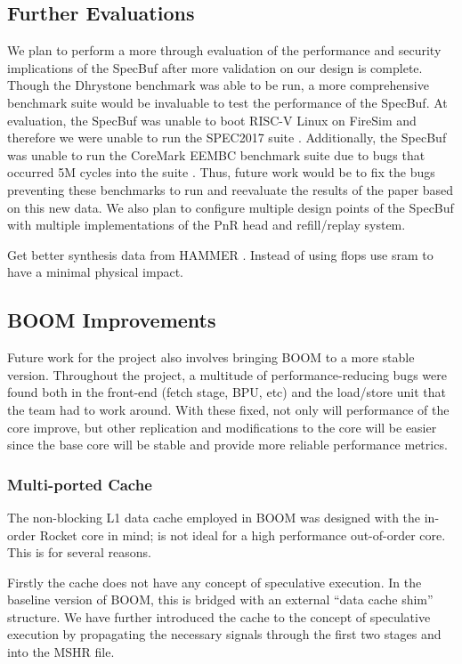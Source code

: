 \subsection{Further Evaluations}

We plan to perform a more through evaluation of the performance and security implications of the
SpecBuf after more validation on our design is complete. 
Though the Dhrystone benchmark was able to be run, a more comprehensive benchmark suite would be invaluable to test
the performance of the SpecBuf. At evaluation, the SpecBuf was unable to boot RISC-V Linux on FireSim and therefore
we were unable to run the SPEC2017 suite \cite{b50}. Additionally, the SpecBuf was unable to run the CoreMark EEMBC benchmark
suite due to bugs that occurred 5M cycles into the suite \cite{b51}. Thus, future work would be to fix the bugs preventing these
benchmarks to run and reevaluate the results of the paper based on this new data. We also plan to configure multiple design
points of the SpecBuf with multiple implementations of the PnR head and refill/replay system.

Get better synthesis data from HAMMER \cite{b52}. Instead of using flops use sram to have a minimal 
physical impact.

\subsection{BOOM Improvements}

Future work for the project also involves bringing BOOM to a more stable version. Throughout
the project, a multitude of performance-reducing bugs were found both in the front-end (fetch stage, BPU, etc) and the 
load/store unit that the team had to work around. With these fixed, not only will performance
of the core improve, but other replication and modifications to the core will be easier since
the base core will be stable and provide more reliable performance metrics.

\subsubsection{Multi-ported Cache}
The non-blocking L1 data cache employed in BOOM was designed with the in-order Rocket core in mind; is not ideal for
a high performance out-of-order core. This is for several reasons.

Firstly the cache does not have any concept of speculative execution.
In the baseline version of BOOM, this is bridged with an external ``data cache shim'' structure. We have further introduced the cache to the
concept of speculative execution by propagating the necessary signals through the first two stages and into the MSHR file.

